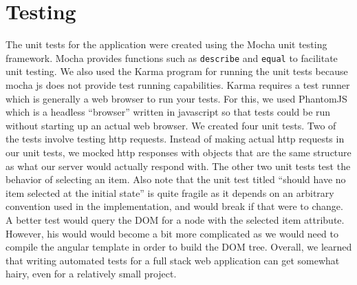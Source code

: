\documentclass[letterpaper, 12pt]{article}
\begin{document}
\section{Testing}
The unit tests for the application were created using the Mocha unit testing framework.  Mocha provides functions such as \texttt{describe} and \texttt{equal} to facilitate unit testing. We also used the Karma program for running the unit tests because mocha js does not provide test running capabilities. Karma requires a test runner which is generally a web browser to run your tests.  For this, we used PhantomJS which is a headless ``browser'' written in javascript so that tests could be run without starting up an actual web browser.  We created four unit tests.  Two of the tests involve testing http requests.  Instead of making actual http requests in our unit tests, we mocked http responses with objects that are the same structure as what our server would actually respond with.  The other two unit tests test the behavior of selecting an item. Also note that the unit test titled ``should have no item selected at the initial state'' is quite fragile as it depends on an arbitrary convention used in the implementation, and would break if that were to change. A better test would query the DOM for a node with the selected item attribute. However, his would would become a bit more complicated as we would need to compile the angular template in order to build the DOM tree. Overall, we learned that writing automated tests for a full stack web application can get somewhat hairy, even for a relatively small project.
\end{document}
